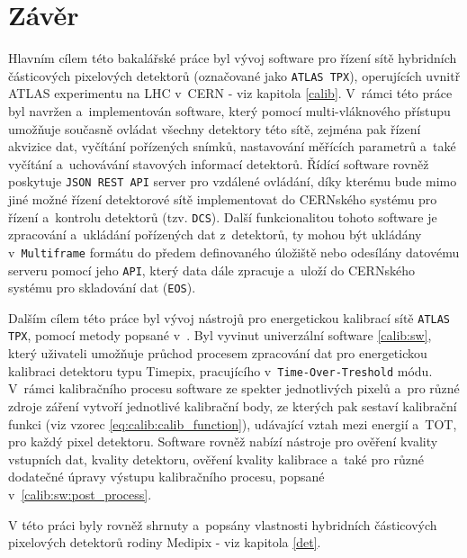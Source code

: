 

\chapter{Závěr}
Hlavním cílem této bakalářské práce byl vývoj software pro řízení sítě hybridních částicových pixelových detektorů (označované jako \texttt{ATLAS TPX}), operujících uvnitř ATLAS experimentu na LHC v~CERN - viz kapitola \ref{calib}. V~rámci této práce byl navržen a~implementován software, který pomocí multi-vláknového přístupu umožňuje současně ovládat všechny detektory této sítě, zejména pak řízení akvizice dat, vyčítání pořízených snímků, nastavování měřících parametrů a~také vyčítání a~uchovávání stavových informací detektorů. Řídící software rovněž poskytuje \texttt{JSON REST API} server pro vzdálené ovládání, díky kterému bude mimo jiné možné řízení detektorové sítě implementovat do CERNského systému pro řízení a~kontrolu detektorů (tzv. \texttt{DCS}). Další funkcionalitou tohoto software je zpracování a~ukládání pořízených dat z~detektorů, ty mohou být ukládány v~\texttt{Multiframe} formátu do předem definovaného úložiště nebo odesílány datovému serveru pomocí jeho \texttt{API}, který data dále zpracuje a~uloží do CERNského systému pro skladování dat (\texttt{EOS}).

Dalším cílem této práce byl vývoj nástrojů pro energetickou kalibrací sítě \texttt{ATLAS TPX}, pomocí metody popsané v~\cite{Jakubek2011S262}. Byl vyvinut univerzální software \ref{calib:sw}, který uživateli umožňuje průchod procesem zpracování dat pro energetickou kalibraci detektoru typu Timepix, pracujícího v~\texttt{Time-Over-Treshold} módu. V~rámci kalibračního procesu software ze spekter jednotlivých pixelů a~pro různé zdroje záření vytvoří jednotlivé kalibrační body, ze kterých pak sestaví kalibrační funkci (viz vzorec \ref{eq:calib:calib_function}), udávající vztah mezi energií a~TOT, pro každý pixel detektoru. Software rovněž nabízí nástroje pro ověření kvality vstupních dat, kvality detektoru, ověření kvality kalibrace a~také pro různé dodatečné úpravy výstupu kalibračního procesu, popsané v~\ref{calib:sw:post_process}.

V této práci byly rovněž shrnuty a~popsány vlastnosti hybridních částicových pixelových detektorů rodiny Medipix - viz kapitola \ref{det}.